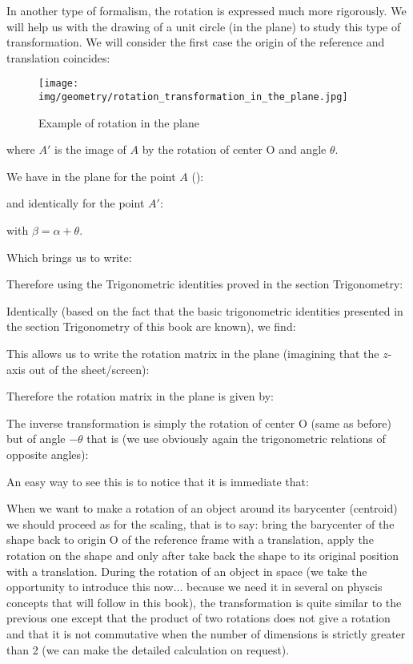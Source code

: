 	In another type of formalism, the rotation is expressed much more rigorously. We will help us with the drawing of a unit circle (in the plane) to study this type of transformation. We will consider the first case the origin of the reference and translation coincides: 
	\begin{figure}[H]
		\centering
		\texttt{[image: img/geometry/rotation\_transformation\_in\_the\_plane.jpg]}
		\caption{Example of rotation in the plane}
	\end{figure}
	where $A'$ is the image of $A$ by the rotation of center O and angle $\theta$.

	We have in the plane for the point $A$ ():
	
	and identically for the point $A'$:
	
	with $\beta=\alpha+\theta$.

	Which brings us to write:
	
	Therefore using the Trigonometric identities proved in the section Trigonometry:
	
	Identically (based on the fact that the basic trigonometric identities presented in the section Trigonometry of this book are known), we find:
	
	This allows us to write the rotation matrix in the plane (imagining that the $z$-axis out of the sheet/screen):
	
	Therefore the rotation matrix in the plane is given by:
	
	The inverse transformation is simply the rotation of center O (same as before) but of angle $-\theta$ that is (we use obviously again the trigonometric relations of opposite angles):
	
	An easy way to see this is to notice that it is immediate that:
	
	When we want to make a rotation of an object around its barycenter (centroid) we should proceed as for the scaling, that is to say: bring the barycenter of the shape back to origin O of the reference frame with a translation, apply the rotation on the shape and only after take back the shape to its original position with a translation.
	During the rotation of an object in space (we take the opportunity to introduce this now... because we need it in several on physcis concepts that will follow in this book), the transformation is quite similar to the previous one except that the product of two rotations does not give a rotation and that it is not commutative when the number of dimensions is strictly greater than 2 (we can make the detailed calculation on request).
	
